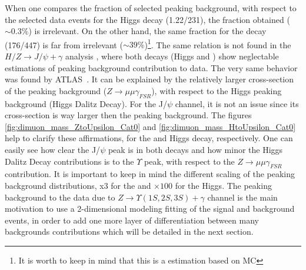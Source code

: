 When one compares the fraction of selected peaking background, with respect to the selected data events for the Higgs decay (1.22/231), the fraction obtained ($\sim0.3\%$) is irrelevant. On the other hand, the same fraction for the \Z decay (176/447) is far from irrelevant ($\sim39\%$)\footnote{It is worth to keep in mind that this is a estimation based on MC}. The same relation is not found in the $H/Z \rightarrow J/\psi + \gamma$ analysis \cite{papper_jpsi}, where both decays (Higgs and \Z) show neglectable estimations of peaking background contribution to data. 
The very same behavior was found by ATLAS~\cite{atlas_paper:PhysRevLett.114.121801}. It can be explained by the relatively larger cross-section of the \Z peaking background ($Z \rightarrow \mu\mu\gamma_{FSR}$), with respect to the Higgs peaking background (Higgs Dalitz Decay). For the J/$\psi$ channel, it is not an issue since its  cross-section is way larger then the peaking background. The figures \ref{fig:dimuon_mass_ZtoUpsilon_Cat0} and \ref{fig:dimuon_mass_HtoUpsilon_Cat0} help to clarify these affirmations, for the \Z and Higgs decay, respectively. 
One can easily see how clear the J/$\psi$ peak is in both decays and how minor the Higgs Dalitz Decay contributions is to the $\Upsilon$ peak, with respect to the $Z \rightarrow \mu\mu\gamma_{FSR}$ contribution. It is important to keep in mind the different scaling of the peaking background distributions, x3 for the \Z and $\times 100$ for the Higgs.
The peaking background to the data due to $Z \rightarrow \Upsilon(1S,2S,3S) + \gamma$ channel  is the main motivation to use a 2-dimensional modeling fitting of the signal and background events, in order to add one more layer of differentiation between many backgrounds contributions which will be detailed in the next section.






